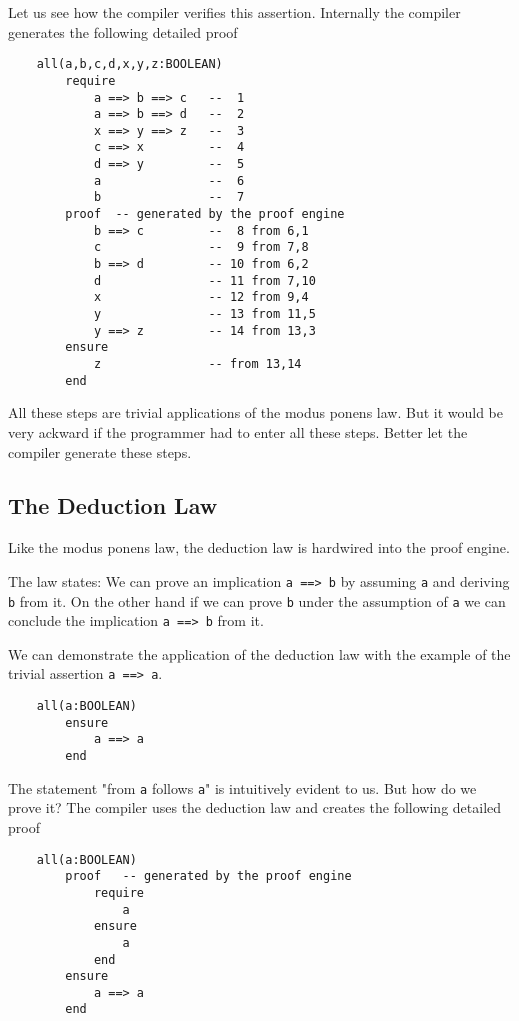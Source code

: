 Let us see how the compiler verifies this assertion. Internally the compiler
generates the following detailed proof

\begin{lstlisting}
    all(a,b,c,d,x,y,z:BOOLEAN)
        require
            a ==> b ==> c   --  1
            a ==> b ==> d   --  2
            x ==> y ==> z   --  3
            c ==> x         --  4
            d ==> y         --  5
            a               --  6
            b               --  7
        proof  -- generated by the proof engine
            b ==> c         --  8 from 6,1
            c               --  9 from 7,8
            b ==> d         -- 10 from 6,2
            d               -- 11 from 7,10
            x               -- 12 from 9,4
            y               -- 13 from 11,5
            y ==> z         -- 14 from 13,3
        ensure
            z               -- from 13,14
        end
\end{lstlisting}

All these steps are trivial applications of the modus ponens law. But it would
be very ackward if the programmer had to enter all these steps. Better let the
compiler generate these steps.

\subsection{The Deduction Law}

Like the modus ponens law, the deduction law is hardwired into the proof
engine.

The law states: We can prove an implication \lstinline!a ==> b! by assuming
\lstinline!a! and deriving \lstinline!b! from it. On the other hand if we can
prove \lstinline!b! under the assumption of \lstinline!a! we can conclude the
implication \lstinline!a ==> b! from it.


We can demonstrate the application of the deduction law with the example of
the trivial assertion \lstinline!a ==> a!.

\begin{lstlisting}
    all(a:BOOLEAN)
        ensure
            a ==> a
        end
\end{lstlisting}

The statement "from \lstinline!a! follows \lstinline!a!" is intuitively evident to us. But how do
we prove it? The compiler uses the deduction law and creates the following
detailed proof

\begin{lstlisting}
    all(a:BOOLEAN)
        proof   -- generated by the proof engine
            require
                a
            ensure
                a
            end
        ensure
            a ==> a
        end
\end{lstlisting}

